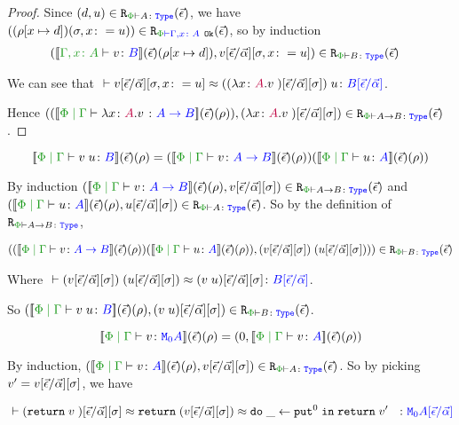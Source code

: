 \documentclass{Report}
\begin{document}
\begin{proof}
    Since $\inLogRelPE{d}{u}{A}$, we have $\inLogRelPEG{(\rho[x\mapsto d])}{(\si, x\setto u)}{\gax}$, so by induction
    \begin{align*}
        \inLogRelPE{\deno{\typerelation{\gax}{v}{B}}(\ev)(\rho[x\mapsto d])&}{v\ssub{\av}{\ev}\sub{\si, x\setto u}}{B}
    \end{align*}

    We can see that $\zberelation{v\ssub{\av}{\ev}{\sub{\si, x\setto u}}}{\apply{((\lam{x}{A}{v})\fundSub)}{u}}{B\ssub{\av}{\ev}}$.

    Hence $\inLogRelPE{(\deno{\gpetyperelation{\lam{x}{A}{v}}{\ab}}\fundRho) }{(\lam{x}{A}{v})\fundSub}{\ab}$.
\end{proof}

\case{\vapply}
\begin{equation}
    \deno{\gpetyperelation{\apply{v}{u}}{B}}\fundRho = (\deno{\gpetyperelation{v}{\ab}}\fundRho)(\deno{\gpetyperelation{u}{A}}\fundRho)
\end{equation}

By induction $\inLogRelPE{\deno{\gpetyperelation{v}{\ab}}\fundRho}{v\fundSub}{\ab}$ and $\inLogRelPE{\deno{\gpetyperelation{u}{A}}\fundRho}{u\fundSub}{A}$. So by the definition of $\erelates{\P}{\ab}$, 

\begin{align*}
   \inLogRelPE{(\deno{\gpetyperelation{v}{\ab}}\fundRho)(\deno{\gpetyperelation{u}{A}}\fundRho)}{\apply{(v\fundSub)}{(u\fundSub)})}{B}
\end{align*}

Where $\zberelation{\apply{(v\fundSub)}{(u\fundSub)}}{(\apply{v}{u})\fundSub}{B\ssub{\av}{\ev}}$.

So $\inLogRelPE{\deno{\gpetyperelation{\apply{v}{u}}{B}}\fundRho}{(\apply{v}{u})\fundSub}{B}$.


\case{\vreturn}

\begin{equation}
    \deno{\gpetyperelation{v}{\M{0}{A}}}\fundRho = (0, \deno{\gpetyperelation{v}{A}}\fundRho)
\end{equation}

By induction, $\inLogRelPE{\deno{\gpetyperelation{v}{A}}\fundRho}{v\fundSub}{A}$. So by picking $v' = v[\vec{\epsilon} / \vec{\alpha}][\sigma]$, we have

\begin{equation}
    \zberelation{(\return{v})\fundSub}{\return{(v\fundSub)\beequiv \doin{\_}{\put^0}{\return{v'}}}}{\M{0}{A\ssub{\av}{\ev}}}
\end{equation}
\end{document}
